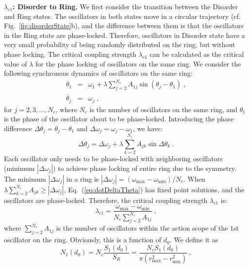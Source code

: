 \documentclass[%
 aip,
 amsmath,amssymb,
 reprint,%
]{revtex4-1}
\begin{document}
\vspace{0.25cm}
\noindent\textbf{$\lambda_{c1}$: Disorder to Ring.}
We first consider the transition between the Disorder and Ring states. The oscillators in both states move in a circular trajectory (cf. Fig.~\ref{fig:disorderState}b), and the difference between them is that the oscillators in the Ring state are phase-locked.
Therefore, oscillators in Disorder state have a very small probability of being randomly distributed on the ring, but without phase locking.
The critical coupling strength $\lambda_{c1}$ can be calculated as the critical value of $\lambda$ for the phase locking of oscillators on the same ring.
We consider the following synchronous dynamics of oscillators on the same ring:
\begin{eqnarray}
    \dot{\theta}_1&=&\omega _1+\lambda \sum_{j=2}^{N_c}{A_{1j}\sin \left( \theta _j-\theta _1 \right)}\;,\label{eq:dotTheta1}
    \\
    \dot{\theta}_j&=&\omega _j\;,\label{eq:dotThetaj}
\end{eqnarray}
for $j=2,3,\ldots,N_c$, where $N_c$ is the number of oscillators on the same ring, and $\theta _1$ is the phase of the oscillator about to be phase-locked. Introducing the phase difference $\Delta \theta _j=\theta _j-\theta _1$ and $\Delta \omega _j=\omega _j-\omega _1$, we have:
\begin{equation}
    \label{eq:dotDeltaTheta}
    \Delta\dot{\theta}_j=\Delta \omega _j+\lambda \sum_{k=2}^{N_c}{A_{jk}\sin \Delta \theta _k}\;.
\end{equation}
Each oscillator only needs to be phase-locked with neighboring oscillators (minimum $\left| \Delta \omega _j \right|$) to achieve phase locking of entire ring due to the symmetry.
The minimum $\left| \Delta \omega _j \right|$ in a ring is $\left| \Delta \omega _j \right|=\left( \omega _{\max}-\omega _{\min} \right) /N_c$. When $\lambda \sum_{k=2}^{N_c}{A_{jk}} \geqslant \left| \Delta \omega _j \right|$, Eq.~(\ref{eq:dotDeltaTheta}) has fixed point solutions, and the oscillators are phase-locked. Therefore, the critical coupling strength $\lambda_{c1}$ is:
\begin{equation}
    \lambda _{c1}=\frac{\omega _{\max}-\omega _{\min}}{N_c\sum\nolimits_{j=2}^{N_c}{A_{1j}}}\;,
\end{equation}
where $\sum\nolimits_{j=2}^{N_c}{A_{1j}}$ is the number of oscillators within the action scope of the $1$st oscillator on the ring. Obviously, this is a function of $d_0$. We define it as
\begin{equation}
    N_1\left( d_0 \right) =N_c\frac{S_1\left( d_0 \right)}{S_R}=\frac{N_cS_1\left( d_0 \right)}{\pi \left( r_{\max}^{2}-r_{\min}^{2} \right)}\;,
\end{equation}
\end{document}
